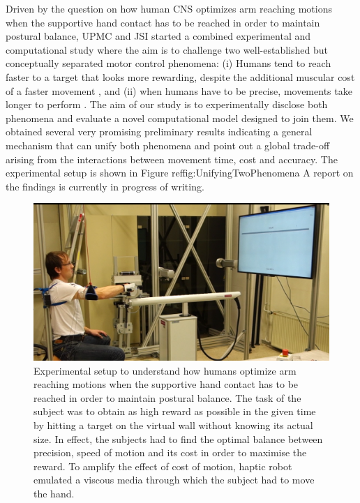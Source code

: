 Driven by the question on how human CNS optimizes arm reaching motions when the supportive hand contact has to be reached in order to maintain postural balance, UPMC and JSI started a combined experimental and computational study where the aim is to challenge two well-established but conceptually separated motor control phenomena: (i) Humans tend to reach faster to a target that looks more rewarding, despite the additional muscular cost of a faster movement \cite{Fitts1954}, and (ii) when humans have to be precise, movements take longer to perform \cite{Shadmehr2010}. The aim of our study is to experimentally disclose both phenomena and evaluate a novel computational model designed to join them. We obtained several very promising preliminary results indicating a general mechanism that can unify both phenomena and point out a global trade-off arising from the interactions between movement time, cost and accuracy. The experimental setup is shown in Figure ref{fig:UnifyingTwoPhenomena} A report on the findings is currently in progress of writing.


\begin{figure}
\centering
\includegraphics[width=\linewidth]{images/UnifyingTwoPhenomena.png}
\caption{Experimental setup to understand how humans optimize arm reaching motions when the supportive hand contact has to be reached in order to maintain postural balance. The task of the subject was to obtain as high reward as possible in the given time by hitting a target on the virtual wall without knowing its actual size. In effect, the subjects had to find the optimal balance between precision, speed of motion and its cost in order to maximise the reward. To amplify the effect of cost of motion, haptic robot emulated a viscous media through which the subject had to move the hand.
}
\label{fig:UnifyingTwoPhenomena}
\end{figure}





